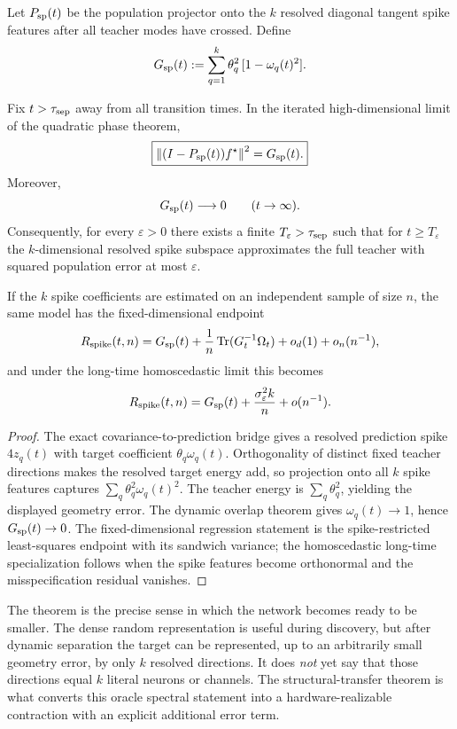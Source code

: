 Let $P_{\rm sp}(t)$ be the population projector onto the $k$ resolved diagonal tangent spike features after all teacher modes have crossed. Define
\[
G_{\rm sp}(t)
:=
\sum_{q=1}^k \theta_q^2\,[1-\omega_q(t)^2].
\]

\begin{theorem}\label{thm:dynamic-compressibility}
Fix $t>\tau_{\rm sep}$ away from all transition times. In the iterated high-dimensional limit of the quadratic phase theorem,
\[
\boxed{
\left\lVert (I-P_{\rm sp}(t))f^\star\right\rVert^2
=
G_{\rm sp}(t).
}
\]
Moreover,
\[
G_{\rm sp}(t)\longrightarrow0
\qquad (t\to\infty).
\]
Consequently, for every $\varepsilon>0$ there exists a finite $T_\varepsilon>\tau_{\rm sep}$ such that for $t\ge T_\varepsilon$ the $k$-dimensional resolved spike subspace approximates the full teacher with squared population error at most $\varepsilon$.

If the $k$ spike coefficients are estimated on an independent sample of size $n$, the same model has the fixed-dimensional endpoint
\[
R_{\rm spike}(t,n)
=
G_{\rm sp}(t)
+\frac1n\operatorname{Tr}(G_t^{-1}\Omega_t)
+o_d(1)+o_n(n^{-1}),
\]
and under the long-time homoscedastic limit this becomes
\[
R_{\rm spike}(t,n)
=
G_{\rm sp}(t)+\frac{\sigma_\varepsilon^2k}{n}+o(n^{-1}).
\]
\end{theorem}

\begin{proof}
The exact covariance-to-prediction bridge gives a resolved prediction spike $4z_q(t)$ with target coefficient $\theta_q\omega_q(t)$. Orthogonality of distinct fixed teacher directions makes the resolved target energy add, so projection onto all $k$ spike features captures $\sum_q\theta_q^2\omega_q(t)^2$. The teacher energy is $\sum_q\theta_q^2$, yielding the displayed geometry error. The dynamic overlap theorem gives $\omega_q(t)\to1$, hence $G_{\rm sp}(t)\to0$. The fixed-dimensional regression statement is the spike-restricted least-squares endpoint with its sandwich variance; the homoscedastic long-time specialization follows when the spike features become orthonormal and the misspecification residual vanishes.
\end{proof}

The theorem is the precise sense in which the network becomes ready to be smaller. The dense random representation is useful during discovery, but after dynamic separation the target can be represented, up to an arbitrarily small geometry error, by only $k$ resolved directions. It does \emph{not} yet say that those directions equal $k$ literal neurons or channels. The structural-transfer theorem is what converts this oracle spectral statement into a hardware-realizable contraction with an explicit additional error term.


